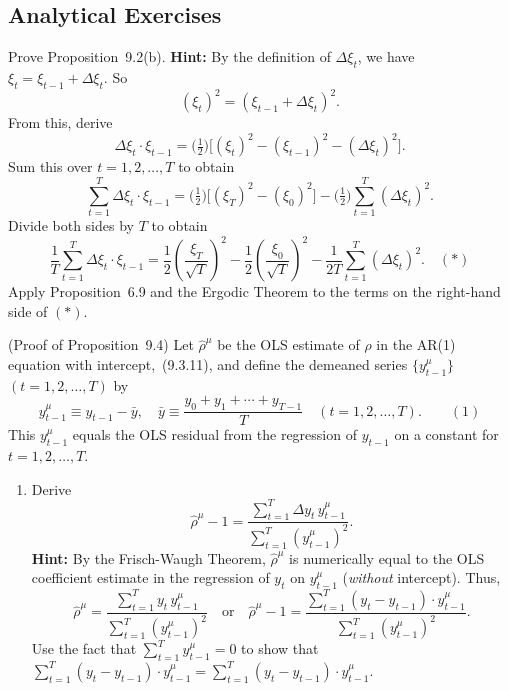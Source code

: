 
\begin{problemset}

\subsection*{Analytical Exercises}

\exercise[1]
Prove Proposition~9.2(b). \textbf{Hint:} By the definition of $\Delta\xi_t$, we have $\xi_t = \xi_{t-1} +
\Delta\xi_t$. So
\[
(\xi_t)^2 = (\xi_{t-1} + \Delta\xi_t)^2.
\]
From this, derive
\[
\Delta\xi_t \cdot \xi_{t-1} = \bigl(\tfrac{1}{2}\bigr)\bigl[(\xi_t)^2 - (\xi_{t-1})^2 - (\Delta\xi_t)^2\bigr].
\]
Sum this over $t = 1, 2, \ldots, T$ to obtain
\[
\sum_{t=1}^{T}\Delta\xi_t \cdot \xi_{t-1}
= \bigl(\tfrac{1}{2}\bigr)\bigl[(\xi_T)^2 - (\xi_0)^2\bigr]
- \bigl(\tfrac{1}{2}\bigr)\sum_{t=1}^{T}(\Delta\xi_t)^2.
\]
Divide both sides by $T$ to obtain
\[
\frac{1}{T}\sum_{t=1}^{T}\Delta\xi_t \cdot \xi_{t-1}
= \frac{1}{2}\left(\frac{\xi_T}{\sqrt{T}}\right)^2
- \frac{1}{2}\left(\frac{\xi_0}{\sqrt{T}}\right)^2
- \frac{1}{2T}\sum_{t=1}^{T}(\Delta\xi_t)^2. \quad (*)
\]
Apply Proposition~6.9 and the Ergodic Theorem to the terms on the right-hand
side of $(*)$.

\exercise[2]
(Proof of Proposition~9.4) \enspace Let $\hat{\rho}^\mu$ be the OLS estimate of $\rho$ in the AR(1)
equation with intercept,~(9.3.11), and define the demeaned series $\{y_{t-1}^\mu\}$ $(t =
1, 2, \ldots, T)$ by
\[
y_{t-1}^\mu \equiv y_{t-1} - \bar{y}, \quad
\bar{y} \equiv \frac{y_0 + y_1 + \cdots + y_{T-1}}{T}
\quad (t = 1, 2, \ldots, T). \qquad (1)
\]
This $y_{t-1}^\mu$ equals the OLS residual from the regression of $y_{t-1}$ on a constant for
$t = 1, 2, \ldots, T$.

\begin{enumerate}[label=(\alph*)]
\item Derive
\begin{equation*}
\hat{\rho}^\mu - 1 = \frac{\sum_{t=1}^{T}\Delta y_t\, y_{t-1}^\mu}{\sum_{t=1}^{T}(y_{t-1}^\mu)^2}.
\tag{2}
\end{equation*}
\textbf{Hint:} By the Frisch-Waugh Theorem, $\hat{\rho}^\mu$ is numerically equal to the OLS
coefficient estimate in the regression of $y_t$ on $y_{t-1}^\mu$ (\emph{without} intercept). Thus,
\[
\hat{\rho}^\mu = \frac{\sum_{t=1}^{T} y_t\, y_{t-1}^\mu}{\sum_{t=1}^{T}(y_{t-1}^\mu)^2}
\quad \text{or} \quad
\hat{\rho}^\mu - 1 = \frac{\sum_{t=1}^{T}(y_t - y_{t-1}) \cdot y_{t-1}^\mu}{\sum_{t=1}^{T}(y_{t-1}^\mu)^2}.
\tag{3}
\]
Use the fact that $\sum_{t=1}^{T} y_{t-1}^\mu = 0$ to show that $\sum_{t=1}^{T}(y_t - y_{t-1}) \cdot y_{t-1}^\mu =
\sum_{t=1}^{T}(y_t - y_{t-1}) \cdot y_{t-1}^\mu$.


\end{enumerate}
\end{problemset}
